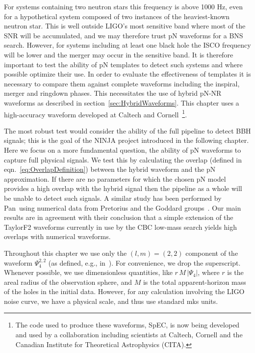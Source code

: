 For systems containing two neutron stars this frequency is above 1000
Hz, even for a hypothetical system composed of two instances of the
heaviest-known neutron star.  This is well outside LIGO's most
sensitive band where most of the SNR will be accumulated, and we may
therefore trust pN waveforms for a BNS search.  However, for systems
including at least one black hole the ISCO frequency will be lower and
the merger may occur in the sensitive band.  It is therefore
important to test the ability of pN templates to detect such systems
and where possible optimize their use.  In order to evaluate the
effectiveness of templates it is necessary to compare them
against complete waveforms including the inspiral, merger and ringdown
phases.  This necessitates the use of hybrid pN-NR waveforms as
described in section~\ref{sec:HybridWaveforms}.  This chapter uses
a high-accuracy waveform developed at Caltech and Cornell~\footnote{The
code used to produce these waveforms, SpEC, is now being developed and
used by a collaboration including scientists at Caltech, Cornell and
the Canadian Institute for Theoretical Astrophysics (CITA).}. 

The most robust test would consider the ability of the full pipeline
to detect BBH signals; this is the goal of the NINJA project
introduced in the following chapter.  Here we focus on a more
fundamental question, the ability of pN waveforms to capture full
physical signals.  We test this by calculating the overlap (defined in
eqn.~\ref{eq:OverlapDefinition}) between the hybrid waveform and the
pN approximation.  If there are no parameters for which the chosen pN
model provides a high overlap with the hybrid signal then the pipeline
as a whole will be unable to detect such signals.  A similar study has
been performed by Pan~\etal using numerical data from Pretorius and
the Goddard groups~\cite{Pan2007}.  Our main results are in agreement
with their conclusion that a simple extension of the TaylorF2
waveforms currently in use by the CBC low-mass search yields high
overlaps with numerical waveforms.

Throughout this chapter we use only the $(l,m)=(2,2)$ component of the
waveform $\Psi_{4}^{2,2}$ (as defined, e.g., in~\cite{Boyle2008a}).
For convenience, we drop the superscript.  Whenever possible, we use
dimensionless quantities, like $r\,M\,\lvert \Psi_{4} \rvert$, where
$r$ is the areal radius of the observation sphere, and $M$ is the
total apparent-horizon mass of the holes in the initial data.
However, for any calculation involving the LIGO noise curve, we have a
physical scale, and thus use standard mks units.  


